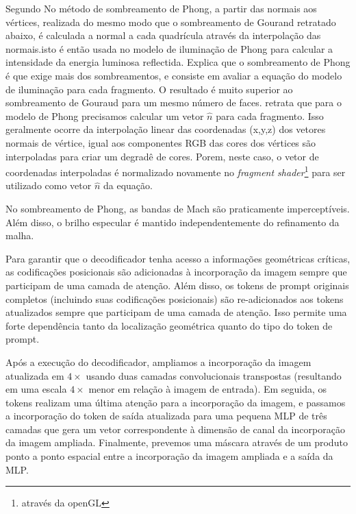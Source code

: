 Segundo \cite{Gomes_undated-tr} No método de sombreamento de Phong, a partir das normais aos vértices, realizada do mesmo modo que o sombreamento de Gourand retratado abaixo, é calculada a normal a cada quadrícula através da interpolação das normais.isto é então usada no modelo de iluminação de Phong para calcular a intensidade da energia luminosa reflectida.  Explica que o sombreamento de Phong é que exige mais dos sombreamentos, e consiste em avaliar a equação do modelo de iluminação para cada fragmento. O resultado é muito superior ao sombreamento de Gouraud para um mesmo número de faces.  retrata que para o modelo de Phong precisamos calcular um vetor \begin{math}\hat{n}\end{math} para cada fragmento. Isso geralmente ocorre da interpolação linear das coordenadas (x,y,z) dos vetores normais de vértice, igual aos componentes RGB das cores dos vértices são interpoladas para criar um degradê de cores. Porem, neste caso, o vetor de coordenadas interpoladas é normalizado novamente no \textit{fragment shader}\footnote{através da openGL} para ser utilizado como vetor \begin{math}\hat{n}\end{math} da equação.

No sombreamento de Phong, as bandas de Mach são praticamente imperceptíveis. Além disso, o brilho especular é mantido independentemente do refinamento da malha.

Para garantir que o decodificador tenha acesso a informações geométricas críticas, as codificações posicionais são adicionadas à incorporação da imagem sempre que participam de uma camada de atenção. Além disso, os tokens de prompt originais completos (incluindo suas codificações posicionais) são re-adicionados aos tokens atualizados sempre que participam de uma camada de atenção. Isso permite uma forte dependência tanto da localização geométrica quanto do tipo do token de prompt.

Após a execução do decodificador, ampliamos a incorporação da imagem atualizada em \(4\times\) usando duas camadas convolucionais transpostas (resultando em uma escala \(4\times\) menor em relação à imagem de entrada). Em seguida, os tokens realizam uma última atenção para a incorporação da imagem, e passamos a incorporação do token de saída atualizada para uma pequena MLP de três camadas que gera um vetor correspondente à dimensão de canal da incorporação da imagem ampliada. Finalmente, prevemos uma máscara através de um produto ponto a ponto espacial entre a incorporação da imagem ampliada e a saída da MLP.

